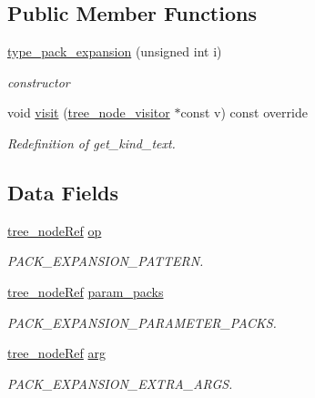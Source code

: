 \subsection*{Public Member Functions}
\begin{DoxyCompactItemize}
\item 
\hyperlink{structtype__pack__expansion_a14be7735f885a65159ed5dc793cf8179}{type\+\_\+pack\+\_\+expansion} (unsigned int i)
\begin{DoxyCompactList}\small\item\em constructor \end{DoxyCompactList}\item 
void \hyperlink{structtype__pack__expansion_a29598e1fd00fefa43588b8b30c8a6675}{visit} (\hyperlink{classtree__node__visitor}{tree\+\_\+node\+\_\+visitor} $\ast$const v) const override
\begin{DoxyCompactList}\small\item\em Redefinition of get\+\_\+kind\+\_\+text. \end{DoxyCompactList}\end{DoxyCompactItemize}
\subsection*{Data Fields}
\begin{DoxyCompactItemize}
\item 
\hyperlink{tree__node_8hpp_a6ee377554d1c4871ad66a337eaa67fd5}{tree\+\_\+node\+Ref} \hyperlink{structtype__pack__expansion_adbf4da3a02d6520fa846a05aee10e3ab}{op}
\begin{DoxyCompactList}\small\item\em P\+A\+C\+K\+\_\+\+E\+X\+P\+A\+N\+S\+I\+O\+N\+\_\+\+P\+A\+T\+T\+E\+RN. \end{DoxyCompactList}\item 
\hyperlink{tree__node_8hpp_a6ee377554d1c4871ad66a337eaa67fd5}{tree\+\_\+node\+Ref} \hyperlink{structtype__pack__expansion_a91a6dbf9d3b70f695a636736ce03c98b}{param\+\_\+packs}
\begin{DoxyCompactList}\small\item\em P\+A\+C\+K\+\_\+\+E\+X\+P\+A\+N\+S\+I\+O\+N\+\_\+\+P\+A\+R\+A\+M\+E\+T\+E\+R\+\_\+\+P\+A\+C\+KS. \end{DoxyCompactList}\item 
\hyperlink{tree__node_8hpp_a6ee377554d1c4871ad66a337eaa67fd5}{tree\+\_\+node\+Ref} \hyperlink{structtype__pack__expansion_ae83ab534e3953eeaed0896e2b2c05aef}{arg}
\begin{DoxyCompactList}\small\item\em P\+A\+C\+K\+\_\+\+E\+X\+P\+A\+N\+S\+I\+O\+N\+\_\+\+E\+X\+T\+R\+A\+\_\+\+A\+R\+GS. \end{DoxyCompactList}\end{DoxyCompactItemize}
